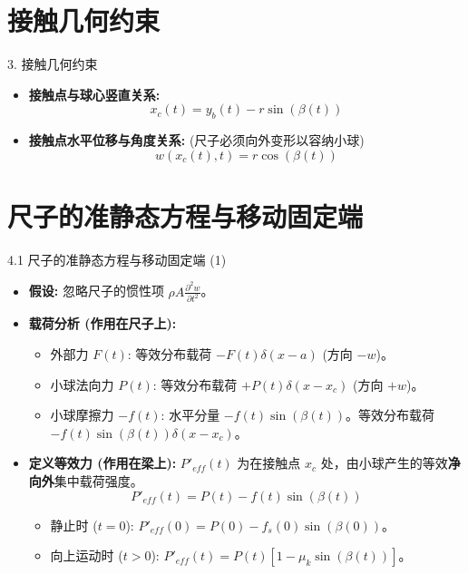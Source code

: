 \documentclass{beamer}
\begin{document}
\section{接触几何约束}
\begin{frame}{3. 接触几何约束}
    \begin{itemize}
        \item \textbf{接触点与球心竖直关系:}
            \begin{equation*}
                \boxed{x_c(t) = y_b(t) - r \sin(\beta(t))}
            \end{equation*}
        \item \textbf{接触点水平位移与角度关系:} (尺子必须向外变形以容纳小球)
            \begin{equation*}
                \boxed{w(x_c(t), t) = r \cos(\beta(t))}
            \end{equation*}
    \end{itemize}
\end{frame}

\section{尺子的准静态方程与移动固定端}
\begin{frame}{4.1 尺子的准静态方程与移动固定端 (1)}
    \begin{itemize}
        \item \textbf{假设:} 忽略尺子的惯性项 $\rho A \frac{\partial^2 w}{\partial t^2}$。
        \item \textbf{载荷分析 (作用在尺子上):}
            \begin{itemize}
                \item 外部力 $F(t)$: 等效分布载荷 $-F(t) \delta(x-a)$ (方向 $-w$)。
                \item 小球法向力 $P(t)$: 等效分布载荷 $+P(t) \delta(x-x_c)$ (方向 $+w$)。
                \item 小球摩擦力 $-f(t)$: 水平分量 $-f(t) \sin(\beta(t))$。等效分布载荷 $-f(t) \sin(\beta(t)) \delta(x-x_c)$。
            \end{itemize}
        \item \textbf{定义等效力 (作用在梁上):} $P'_{eff}(t)$ 为在接触点 $x_c$ 处，由小球产生的等效\textbf{净向外}集中载荷强度。
            \begin{equation*}
            \boxed{P'_{eff}(t) = P(t) - f(t) \sin(\beta(t))}
            \end{equation*}
            \begin{itemize}
                \item 静止时 ($t=0$): $P'_{eff}(0) = P(0) - f_s(0) \sin(\beta(0))$。
                \item 向上运动时 ($t>0$): $P'_{eff}(t) = P(t)[1 - \mu_k \sin(\beta(t))]$。
            \end{itemize}
    \end{itemize}
\end{frame}
\end{document}
